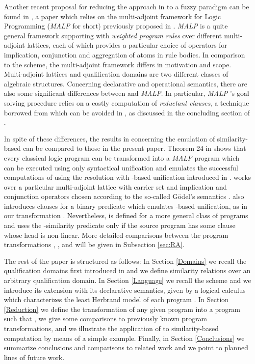 \documentclass{sigplanconf}
\newcommand{\MALP}{{\em MALP }}
\newcommand{\malp}{{\em MALP}}
\theoremstyle{definition}
\theoremstyle{plain}
\begin{document}
Another recent proposal for reducing the  approach in \cite{Ses02} to a fuzzy  paradigm can be found in \cite{MOV04}, a  paper which relies on  the multi-adjoint framework for Logic Programming ({\MALP} for short) previously proposed in \cite{MOV01a,MOV01b}. {\MALP} is a quite general framework supporting  with {\em weighted program rules} over different multi-adjoint lattices, each of which provides a particular choice of operators for implication, conjunction  and aggregation of atoms in rule bodies. In comparison to the  scheme, the multi-adjoint framework differs in motivation and scope. Multi-adjoint lattices and qualification domains are  two different classes of algebraic structures. Concerning declarative and
operational semantics, there are also some significant differences between  and \malp. In particular, \MALP's goal solving procedure relies on a costly computation of {\em reductant clauses}, a technique borrowed from \cite{KS92} which can be avoided in , as discussed in the concluding section of \cite{RR08}.

In spite of these differences, the results in \cite{MOV04} concerning the emulation of similarity-based  can be compared to those in the present paper. Theorem 24 in \cite{MOV04} shows that  every classical logic  program  can be transformed into a \MALP program  which can be executed using only syntactical unification and emulates the successful computations of  using the  resolution with -based unification
introduced  in \cite{Ses02}.  works over a particular multi-adjoint lattice  with carrier set  and implication and conjunction operators chosen according to the so-called G\"{o}del's semantics \cite{Voj01}.  also introduces clauses for a binary predicate  which emulates -based unification, as in our transformation . Nevertheless,    is defined for a more general class of programs and uses the -similarity predicate  only if the source program  has some clause whose head is non-linear. More detailed comparisons between the program transformations ,  ,  and  will be given in Subsection \ref{sec:RA}.

The rest of the paper is structured as follows: In Section \ref{Domains} we recall the qualification domains   first introduced in \cite{RR08} and we define similarity relations  over an arbitrary qualification domain. In Section \ref{Language} we recall the scheme  and we introduce its extension  with its declarative semantics, given by a logical calculus which characterizes the least
Herbrand model  of each  program . In Section \ref{Reduction} we define the transformation  of any given  program  into a  program  such that , we give some comparisons to previously known program transformations, and we illustrate the application of
 to similarity-based computation by means of a simple example. Finally, in Section \ref{Conclusions} we summarize conclusions and comparisons to related work and we point to planned lines of future work.
\end{document}

